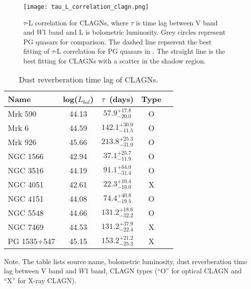\begin{figure}
\centering
	\texttt{[image: tau\_L\_correlation\_clagn.png]}
    \caption{$\tau$-L correlation for CLAGNs, where $\tau$ is time lag between V band and $W$1 band and L is bolometric luminosity. Grey circles represent PG quasars \citep{2019ApJ...886...33L} for comparison. The dashed line repserent the best fitting of $\tau$-L correlation for PG quasars in \citet{2019ApJ...886...33L}. The straight line is the best fitting for CLAGNs with a scatter in the shadow region.} 
    \label{fig:tau_L}
\end{figure}


\begin{table}
 \caption{Dust reverberation time lag of CLAGNs.
}
 \label{table_lag}
 \begin{center}
 \begin{tabular}{lcccc}
 \hline\hline
Name & log($L_{bol}$) & $\tau$~(days) &Type \\ \hline 
Mrk 590 & 44.13 & $57.9^{+17.8}_{-20.0}$ & O \\
Mrk 6 & 44.59 & $142.1^{+30.0}_{-11.5}$ & O \\
Mrk 926 & 45.66 & $213.8^{+25.3}_{-31.0}$ & O \\
NGC 1566 & 42.94 & $37.1^{+25.7}_{-11.9}$ & O \\
NGC 3516 & 44.19 & $91.1^{+64.0}_{-31.4}$ & O \\
NGC 4051 & 42.61 & $22.3^{+10.4}_{-10.0}$ & X \\
NGC 4151 & 44.08 & $74.4^{+40.8}_{-19.5}$ & O \\
NGC 5548 & 44.66 & $131.2^{+18.6}_{-32.2}$ & O \\
NGC 7469 & 44.53 & $131.2^{+37.9}_{-22.4}$ & X \\
PG 1535+547 & 45.15 & $153.2^{+21.2}_{-25.3}$ & X \\
\hline\hline
\end{tabular}
\end{center}
Note. The table lists source name, bolometric luminosity, dust reverberation time lag between V band and $W$1 band, CLAGN types (``O'' for optical CLAGN and ``X'' for X-ray CLAGN). 
\end{table}


